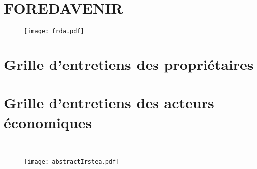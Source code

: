 \documentclass[12pt]{report}
\begin{document}
\printbibliography[heading=bibliog]

\appendix

\chapter{FOREDAVENIR}\label{App:appxA}
\begin{figure}
  \centering
  \texttt{[image: frda.pdf]}
\end{figure}
\restoregeometry

%

%

\chapter{Grille d'entretiens des propriétaires}
\label{App:appxB}

\chapter{Grille d'entretiens des acteurs économiques}
\label{App:appxC}

\clearpage
{}
\printindex

\newpage
\thispagestyle{empty}
~
\newpage

\begin{figure}
  \centering
  \texttt{[image: abstractIrstea.pdf]}
\end{figure}
\restoregeometry
\end{document}
